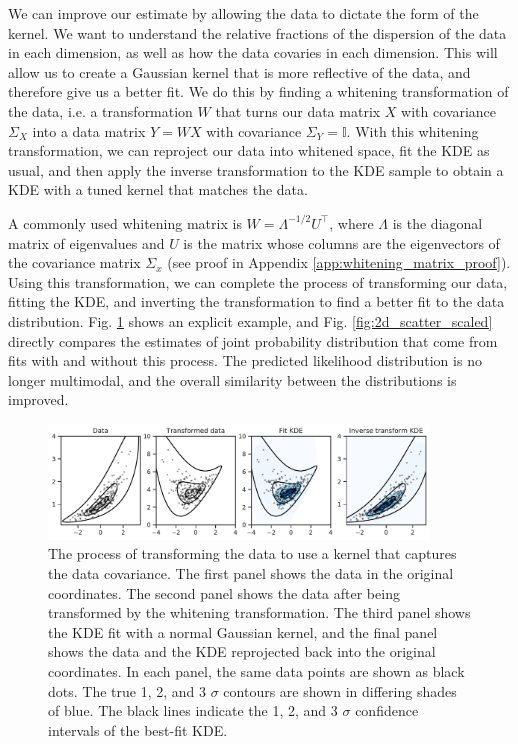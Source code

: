 We can improve our estimate by allowing the data to dictate the form of the kernel. We want to understand the relative fractions of the dispersion of the data in each dimension, as well as how the data covaries in each dimension. This will allow us to create a Gaussian kernel that is more reflective of the data, and therefore give us a better fit. We do this by finding a whitening transformation of the data, i.e. a transformation $W$ that turns our data matrix $X$ with covariance $\Sigma_X$ into a data matrix $Y=WX$ with covariance $\Sigma_Y=\mathbb{I}$. With this whitening transformation, we can reproject our data into whitened space, fit the KDE as usual, and then apply the inverse transformation to the KDE sample to obtain a KDE with a tuned kernel that matches the data.

A commonly used whitening matrix is $W = \Lambda^{-1/2}U^\top$, where $\Lambda$ is the diagonal matrix of eigenvalues and $U$ is the matrix whose columns are the eigenvectors of the covariance matrix $\Sigma_x$ (see proof in Appendix \ref{app:whitening_matrix_proof}). Using this transformation, we can complete the process of transforming our data, fitting the KDE, and inverting the transformation to find a better fit to the data distribution. Fig. \ref{fig:2d_rescaling_process} shows an explicit example, and Fig. \ref{fig:2d_scatter_scaled} directly compares the estimates of joint probability distribution that come from fits with and without this process. The predicted likelihood distribution is no longer multimodal, and the overall similarity between the distributions is improved.

\begin{figure}
    \centering
    \includegraphics[width=0.9\textwidth]{figures/snemo_kde/2d_rescaling_process.pdf}
    \caption{The process of transforming the data to use a kernel that captures the data covariance. The first panel shows the data in the original coordinates. The second panel shows the data after being transformed by the whitening transformation. The third panel shows the KDE fit with a normal Gaussian kernel, and the final panel shows the data and the KDE reprojected back into the original coordinates. In each panel, the same data points are shown as black dots. The true 1, 2, and 3 $\sigma$ contours are shown in differing shades of blue. The black lines indicate the 1, 2, and 3 $\sigma$ confidence intervals of the best-fit KDE.}
    \label{fig:2d_rescaling_process}
\end{figure}

